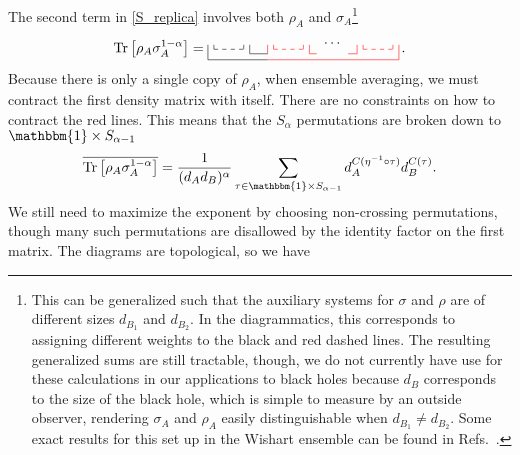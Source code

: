 \documentclass[a4paper,11pt]{article}
\newcommand{\Tr}{\text{Tr}}
\begin{document}
The second term in \eqref{S_replica} involves both $\rho_A$ and $\sigma_A$\footnote{This can be generalized such that the auxiliary systems for $\sigma$ and $\rho$ are of different sizes $d_{B_1}$ and $d_{B_2}$. In the diagrammatics, this corresponds to assigning different weights to the black and red dashed lines. The resulting generalized sums are still tractable, though, we do not currently have use for these calculations in our applications to black holes because $d_{B}$ corresponds to the size of the black hole, which is simple to measure by an outside observer, rendering $\sigma_A$ and $\rho_A$ easily distinguishable when $d_{B_1}\neq d_{B_2}$. Some exact results for this set up in the Wishart ensemble can be found in Refs.~\cite{2020PhRvA.102a2405K,2020JPhA...53X5202K,2021arXiv210502743L}.}
\begin{align}
    \Tr\left[ \rho_A \sigma_A^{1-\alpha}\right]
    =
    \tikz[scale=0.75,baseline=-0.5ex]{
    \draw[dashed] (0,0) -- (1,0);
    \draw (0,0)-- (0,.15);
    \draw (1,0)-- (1,.15);
    \draw (-0.2,0.15)-- (-0.2,-0.35);
    \draw (1.2,-0.15)-- (1.2,0.15);
    \draw[dashed,red] (2,0) -- (3,0);
    \draw[red] (2,0)-- (2,0.15);
    \draw[red] (3,0)-- (3,0.15);
    \draw[red] (1.8,-.15)-- (1.8,0.15);
    \draw[red] (3.2,-0.15)-- (3.2,0.15);
    \draw[dashed,red] (5,0) -- (6,0);
    \draw[red] (5,0)-- (5,0.15);
    \draw[red] (6,0)-- (6,0.15);
    \draw[red] (4.8,0.15)-- (4.8,-0.15);
    \draw[red] (6.2,-0.35)-- (6.2,0.15);
    \draw (1.2,-0.15)--(1.8,-0.15);
    \draw[red] (3.2,-0.15)--(3.45,-0.15);
    \draw[black] (-0.2,-0.35)-- (1.8,-0.35);
    \draw[red] (1.8,-0.35)-- (6.2,-0.35);
    \draw[red] (4.5,-0.15)--(4.8,-0.15);
    \node[] at (4.,0.2) {$\cdots$};
    } \, .
\end{align}
Because there is only a single copy of $\rho_A$, when ensemble averaging, we must contract the first density matrix with itself. There are no constraints on how to contract the red lines. This means that the $S_{\alpha}$ permutations are broken down to $\mathbbm{1}\times S_{\alpha-1}$
\begin{align}
    \overline{\Tr\left[ \rho_A \sigma_A^{1-\alpha}\right]} =\frac{1}{(d_A d_B)^{\alpha}} \sum_{\tau \in \mathbbm{1}\times S_{\alpha -1}} d_A^{C(\eta^{-1}\circ \tau)}d_B^{C(\tau)}.
    \label{vn_RE_sum}
\end{align}
We still need to maximize the exponent by choosing non-crossing permutations, though many such permutations are disallowed by the identity factor on the first matrix.
The diagrams are topological, so we have
\end{document}
